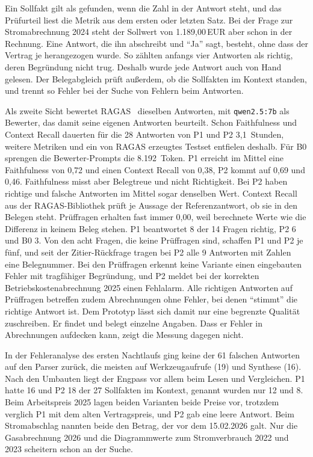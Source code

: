 Ein Sollfakt gilt als gefunden, wenn die Zahl in der Antwort steht, und das Prüfurteil liest die Metrik aus dem ersten oder letzten Satz. Bei der Frage zur Stromabrechnung 2024 steht der Sollwert von 1.189,00\,EUR aber schon in der Rechnung. Eine Antwort, die ihn abschreibt und \enquote{Ja} sagt, besteht, ohne dass der Vertrag je herangezogen wurde. So zählten anfangs vier Antworten als richtig, deren Begründung nicht trug. Deshalb wurde jede Antwort auch von Hand gelesen. Der Belegabgleich prüft außerdem, ob die Sollfakten im Kontext standen, und trennt so Fehler bei der Suche von Fehlern beim Antworten.

Als zweite Sicht bewertet RAGAS~\cite{es2024ragas} dieselben Antworten, mit \texttt{qwen2.5:7b} als Bewerter, das damit seine eigenen Antworten beurteilt. Schon Faithfulness und Context Recall dauerten für die 28 Antworten von P1 und P2 3,1~Stunden, weitere Metriken und ein von RAGAS erzeugtes Testset entfielen deshalb. Für B0 sprengen die Bewerter-Prompts die 8.192~Token. P1 erreicht im Mittel eine Faithfulness von 0,72 und einen Context Recall von 0,38, P2 kommt auf 0,69 und 0,46. Faithfulness misst aber Belegtreue und nicht Richtigkeit. Bei P2 haben richtige und falsche Antworten im Mittel sogar denselben Wert. Context Recall aus der RAGAS-Bibliothek prüft je Aussage der Referenzantwort, ob sie in den Belegen steht. Prüffragen erhalten fast immer 0,00, weil berechnete Werte wie die Differenz in keinem Beleg stehen.
P1 beantwortet 8 der 14 Fragen richtig, P2 6 und B0 3. Von den acht Fragen, die keine Prüffragen sind, schaffen P1 und P2 je fünf, und seit der Zitier-Rückfrage tragen bei P2 alle 9 Antworten mit Zahlen eine Belegnummer. Bei den Prüffragen erkennt keine Variante einen eingebauten Fehler mit tragfähiger Begründung, und P2 meldet bei der korrekten Betriebskostenabrechnung 2025 einen Fehlalarm. Alle richtigen Antworten auf Prüffragen betreffen zudem Abrechnungen ohne Fehler, bei denen \enquote{stimmt} die richtige Antwort ist. Dem Prototyp lässt sich damit nur eine begrenzte Qualität zuschreiben. Er findet und belegt einzelne Angaben. Dass er Fehler in Abrechnungen aufdecken kann, zeigt die Messung dagegen nicht.

In der Fehleranalyse des ersten Nachtlaufs ging keine der 61 falschen Antworten auf den Parser zurück, die meisten auf Werkzeugaufrufe (19) und Synthese (16). Nach den Umbauten liegt der Engpass vor allem beim Lesen und Vergleichen. P1 hatte 16 und P2 18 der 27 Sollfakten im Kontext, genannt wurden nur 12 und 8. Beim Arbeitspreis 2025 lagen beiden Varianten beide Preise vor, trotzdem verglich P1 mit dem alten Vertragspreis, und P2 gab eine leere Antwort. Beim Stromabschlag nannten beide den Betrag, der vor dem 15.02.2026 galt. Nur die Gasabrechnung 2026 und die Diagrammwerte zum Stromverbrauch 2022 und 2023 scheitern schon an der Suche.

